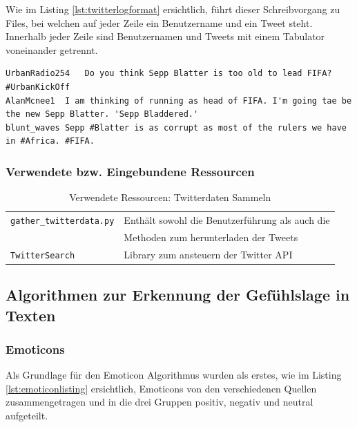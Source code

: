 Wie im Listing \ref{lst:twitterlogformat} ersichtlich, führt dieser Schreibvorgang zu Files, bei welchen auf jeder Zeile ein Benutzername und ein Tweet steht. Innerhalb jeder Zeile sind Benutzernamen und Tweets mit einem Tabulator voneinander getrennt.

\begin{lstlisting}[showtabs=true, caption={Twitter Logfile Format)}, label={lst:twitterlogformat}]
UrbanRadio254	Do you think Sepp Blatter is too old to lead FIFA? #UrbanKickOff
AlanMcnee1	I am thinking of running as head of FIFA. I'm going tae be the new Sepp Blatter. 'Sepp Bladdered.'
blunt_waves	Sepp #Blatter is as corrupt as most of the rulers we have in #Africa. #FIFA.
\end{lstlisting}

\subsubsection{Verwendete bzw. Eingebundene Ressourcen}
\begin{table}[H]
\begin{center}
\begin{tabular}{|l|l|}
	\hline
	\lstinline$gather_twitterdata.py$ & Enthält sowohl die Benutzerführung als auch die\\
	& Methoden zum herunterladen der Tweets \\ \hline
	\lstinline$TwitterSearch$ & Library zum ansteuern der Twitter API\\ \hline
\end{tabular}
\caption{Verwendete Ressourcen: Twitterdaten Sammeln}
\end{center}
\end{table}

\subsection{Algorithmen zur Erkennung der Gefühlslage in Texten}
\subsubsection{Emoticons}
Als Grundlage für den Emoticon Algorithmus wurden als erstes, wie im Listing \ref{lst:emoticonlisting} ersichtlich, Emoticons von den verschiedenen Quellen \cite{emoticons1}\cite{emoticons2}\cite{emoticons3}\cite{emoticons4} zusammengetragen und in die drei Gruppen positiv, negativ und neutral aufgeteilt.

